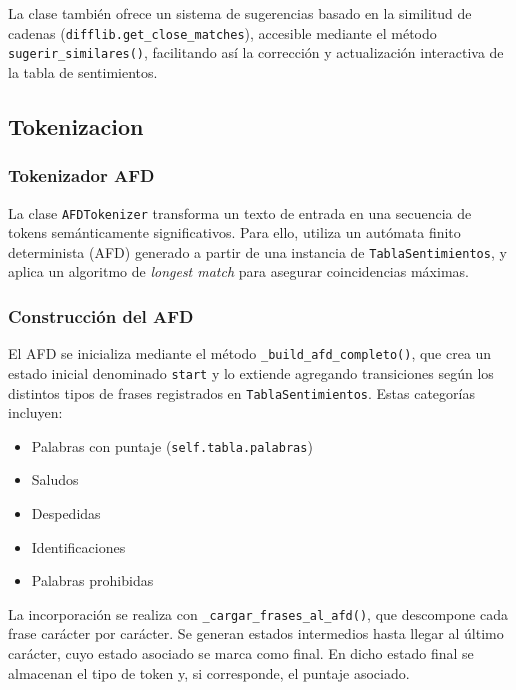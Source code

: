 La clase también ofrece un sistema de sugerencias basado en la similitud de cadenas
(\texttt{difflib.get\_close\_matches}), accesible mediante el método
\texttt{sugerir\_similares()}, facilitando así la corrección y actualización interactiva de la
tabla de sentimientos.

\subsection{Tokenizacion}

\subsubsection{Tokenizador AFD}

La clase \texttt{AFDTokenizer} transforma un texto de entrada en una secuencia de tokens
semánticamente significativos. Para ello, utiliza un autómata finito determinista (AFD)
generado a partir de una instancia de \texttt{TablaSentimientos}, y aplica un algoritmo de
\textit{longest match} para asegurar coincidencias máximas.

\subsubsection{Construcción del AFD}

El AFD se inicializa mediante el método \texttt{\_build\_afd\_completo()}, que crea un estado
inicial denominado \texttt{start} y lo extiende agregando transiciones según los distintos
tipos de frases registrados en \texttt{TablaSentimientos}. Estas categorías incluyen:

\begin{itemize}
	\item Palabras con puntaje (\texttt{self.tabla.palabras})
	\item Saludos
	\item Despedidas
	\item Identificaciones
	\item Palabras prohibidas
\end{itemize}

La incorporación se realiza con \texttt{\_cargar\_frases\_al\_afd()}, que descompone cada frase
carácter por carácter. Se generan estados intermedios hasta llegar al último carácter, cuyo
estado asociado se marca como final. En dicho estado final se almacenan el tipo de token y, si
corresponde, el puntaje asociado.

